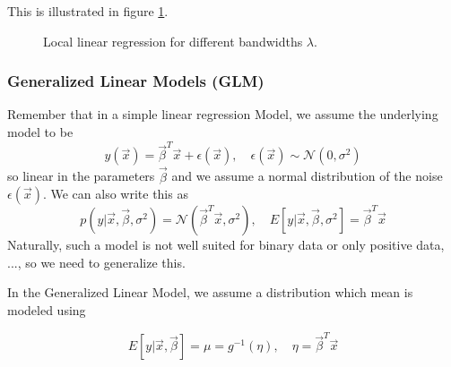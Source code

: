 This is illustrated in figure \ref{fig:local_linear_regression}.

\begin{figure}[!htb]
 \centering
 \hfill
 \caption{Local linear regression for different bandwidths $\lambda$.}
 \label{fig:local_linear_regression}
\end{figure}


\subsubsection{Generalized Linear Models (GLM)\skipthis}

Remember that in a simple linear regression Model, we assume the underlying model to be
\begin{equation}
    y(\vec{x}) = \vec{\beta}^T \vec{x} + \epsilon(\vec{x}), \quad \epsilon(\vec{x}) \sim \mathcal{N}(0, \sigma^2)
\end{equation}
so linear in the parameters $\vec{\beta}$ and we assume a normal distribution of the noise $\epsilon(\vec{x})$.
We can also write this as
\begin{equation}
    p(y | \vec{x}, \vec{\beta}, \sigma^2) = \mathcal{N}(\vec{\beta}^T \vec{x}, \sigma^2), \quad E{\left[ y | \vec{x}, \vec{\beta}, \sigma^2 \right]} = \vec{\beta}^T \vec{x}
\end{equation}
Naturally, such a model is not well suited for binary data or only positive data, ..., so we need to generalize this.


In the Generalized Linear Model, we assume a distribution which mean is modeled using

\begin{equation}
    E{\left[ y | \vec{x}, \vec{\beta} \right]} = \mu = g^{-1}(\eta), \quad \eta = \vec{\beta}^T \vec{x}
\end{equation}


